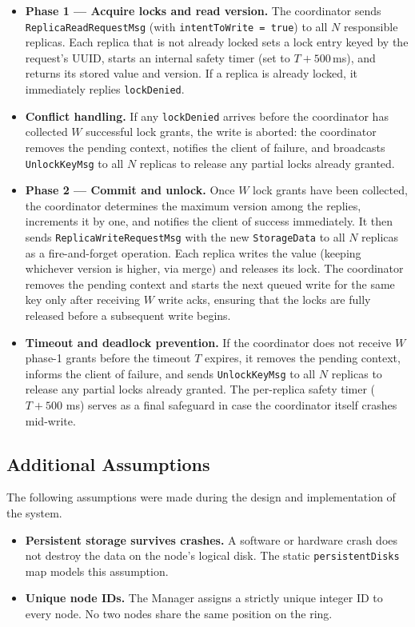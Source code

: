 \begin{itemize}
    \item \textbf{Phase 1 --- Acquire locks and read version.}
    The coordinator sends \texttt{ReplicaReadRequestMsg} (with
    \texttt{intentToWrite = true}) to all $N$ responsible replicas. Each
    replica that is not already locked sets a lock entry keyed by the
    request's UUID, starts an internal safety timer (set to $T + 500$\,ms),
    and returns its stored value and version. If a replica is already locked,
    it immediately replies \texttt{lockDenied}.

    \item \textbf{Conflict handling.}
    If any \texttt{lockDenied} arrives before the coordinator has collected
    $W$ successful lock grants, the write is aborted: the coordinator removes
    the pending context, notifies the client of failure, and broadcasts
    \texttt{UnlockKeyMsg} to all $N$ replicas to release any partial locks
    already granted.

    \item \textbf{Phase 2 --- Commit and unlock.}
    Once $W$ lock grants have been
    collected, the coordinator determines the maximum version among the replies,
    increments it by one, and notifies the client of success immediately. It then
    sends \texttt{ReplicaWriteRequestMsg} with the new \texttt{StorageData} to all
    $N$ replicas as a fire-and-forget operation. Each replica writes the value
    (keeping whichever version is higher, via merge) and releases its lock. The
    coordinator removes the pending context and starts the next queued write for
    the same key only after receiving $W$ write acks, ensuring that the locks are
    fully released before a subsequent write begins.

    \item \textbf{Timeout and deadlock prevention.}
    If the coordinator does not
    receive $W$ phase-1 grants before the timeout $T$ expires, it removes the
    pending context, informs the client of failure, and sends \texttt{UnlockKeyMsg}
    to all $N$ replicas to release any partial locks already granted. The
    per-replica safety timer ($T + 500$ ms) serves as a final safeguard in case
    the coordinator itself crashes mid-write.
\end{itemize}

\subsection{Additional Assumptions}
The following assumptions were made during the design and implementation of
the system.

\begin{itemize}
    \item \textbf{Persistent storage survives crashes.} A software or hardware
        crash does not destroy the data on the node's logical disk. The static
        \texttt{persistentDisks} map models this assumption.

    \item \textbf{Unique node IDs.} The Manager assigns a strictly unique
        integer ID to every node. No two nodes share the same position on
        the ring.
\end{itemize}
